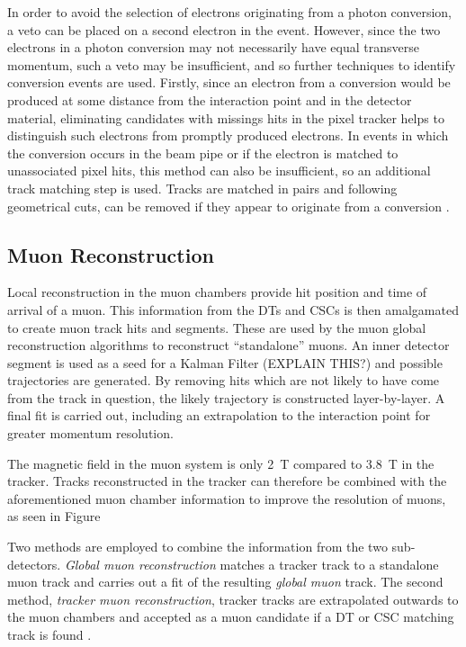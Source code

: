 In order to avoid the selection of electrons originating from a photon conversion, a veto can be placed on a
second electron in the event. However, since the two electrons in a photon conversion may not necessarily have
equal transverse momentum, such a veto may be insufficient, and so further techniques to identify conversion
events are used. Firstly, since an electron from a conversion would be produced at some distance from the
interaction point and in the detector material, eliminating candidates with missings hits in the pixel tracker
helps to distinguish such electrons from promptly produced electrons. In events in which the conversion occurs
in the beam pipe or if the electron is matched to unassociated pixel hits, this method can also be
insufficient, so an additional track matching step is used. Tracks are matched in pairs and following
geometrical cuts, can be removed if they appear to originate from a conversion \cite{electron_reconstruction}.

\subsection{Muon Reconstruction}
\label{ss:muon_reconstruction}
Local reconstruction in the muon chambers provide hit position and time of arrival of a muon. This information
from the DTs and CSCs is then amalgamated to create muon track hits and segments. These are used by the muon
global reconstruction algorithms to reconstruct ``standalone'' muons. An inner detector segment is used as a
seed for a Kalman Filter (EXPLAIN THIS?) \cite{kalman_filter} and possible trajectories are generated. By
removing hits which are not likely to have come from the track in question, the likely trajectory is
constructed layer-by-layer. A final fit is carried out, including an extrapolation to the interaction point
for greater momentum resolution.

The magnetic field in the muon system is only 2~T compared to 3.8~T in the tracker. Tracks reconstructed in
the tracker can therefore be combined with the aforementioned muon chamber information to improve the
\pt resolution of muons, as seen in Figure%

Two methods are employed to combine the information from the two sub-detectors. \textit{Global muon
reconstruction} matches a tracker track to a standalone muon track and carries out a fit of the resulting
\textit{global muon} track. The second method, \textit{tracker muon reconstruction}, tracker tracks are
extrapolated outwards to the muon chambers and accepted as a muon candidate if a DT or CSC matching track is
found \cite{muon_reconstruction}.

